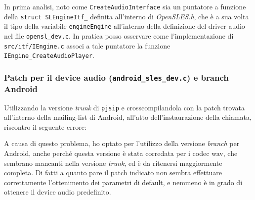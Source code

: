 In prima analisi, noto come \texttt{\small CreateAudioInterface} sia 
	un puntatore a funzione della \texttt{\small struct SLEngineItf\_} definita 
	all'interno di \textit{OpenSLES.h}, che è a sua volta il tipo della variabile 
	\texttt{\small engineEngine} all'interno della definizione del driver audio 
	nel file  \texttt{\small opensl\_dev.c}. In pratica posso osservare come
	l'implementazione di \texttt{\small src/itf/IEngine.c} associ a tale 
puntatore la funzione \texttt{\small IEngine\_CreateAudioPlayer}.

\subsubsection{Patch per il device audio (\texttt{android\_sles\_dev.c}) e branch Android}
Utilizzando la versione \textit{trunk} di \texttt{\small pjsip} e crosscompilandola con 
la patch trovata all'interno della mailing-list di Android, all'atto dell'instaurazione
della chiamata, riscontro il seguente errore:
A causa di questo problema, ho optato per l'utilizzo della versione \textit{branch} 
per Android, anche perché questa versione è stata corredata per i codec wav, che 
sembrano mancanti nella versione \textit{trunk}, ed è  da 
ritenersi maggiormente completa. Di fatti a quanto pare il patch indicato non
sembra effettuare correttamente l'ottenimento dei parametri di default, e nemmeno
è in grado di ottenere il device audio predefinito. 

